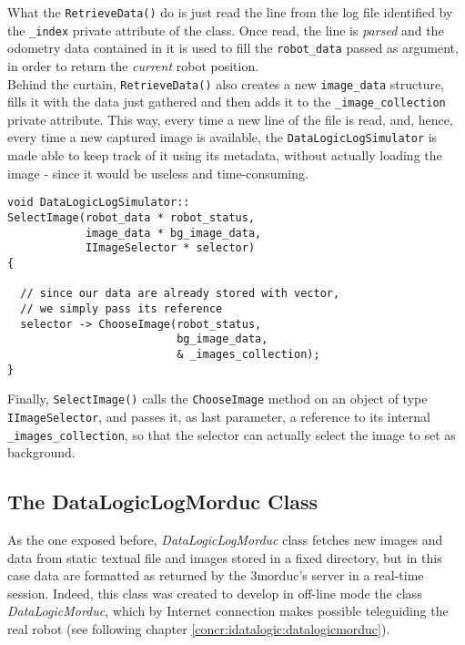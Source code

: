 What the \texttt{RetrieveData()} do is just read the line from the log 
file identified by the \texttt{\_index} private attribute of the class.
Once read, the line is \textit{parsed} and the odometry data contained 
in it is used to fill the \texttt{robot\_data} passed as argument, in 
order to return the \textit{current} robot position.
\\
Behind the curtain, \texttt{RetrieveData()} also creates a new 
\texttt{image\_data} structure, fills it with the data just 
gathered and then adds it to the \texttt{\_image\_collection} 
private attribute.
This way, every time a new line of the file is read, and, hence, 
every time a new captured image is available, the \texttt{DataLogicLogSimulator} 
is made able to keep track of it using its metadata, without actually 
loading the image - since it would be useless and time-consuming.

\begin{lstlisting}[caption={\texttt{DataLogic::SelectImage()} method}, label={code:selectimage_method}, frame=trBL]
void DataLogicLogSimulator::
SelectImage(robot_data * robot_status,
            image_data * bg_image_data,
            IImageSelector * selector)
{

  // since our data are already stored with vector,
  // we simply pass its reference
  selector -> ChooseImage(robot_status, 
                          bg_image_data, 
                          & _images_collection);
}
\end{lstlisting}

Finally, \texttt{SelectImage()} calls the \texttt{ChooseImage} method 
on an object of type \texttt{IImageSelector}, and passes it, as last 
parameter, a reference to its internal \texttt{\_images\_collection}, 
so that the selector can actually select the image to set as 
background.


\subsection{The DataLogicLogMorduc Class}
\label{concr:idatalogic:datalogiclogmorduc}

As the one exposed before, \textit{DataLogicLogMorduc} class
fetches new images and data from static textual file and images
stored in a fixed directory, but in this case data are formatted
as returned by the 3morduc's server in a real-time session. Indeed,
this class was created to develop in off-line mode the class
\textit{DataLogicMorduc}, which by Internet connection makes possible
teleguiding the real robot (see following chapter
\ref{concr:idatalogic:datalogicmorduc}).

